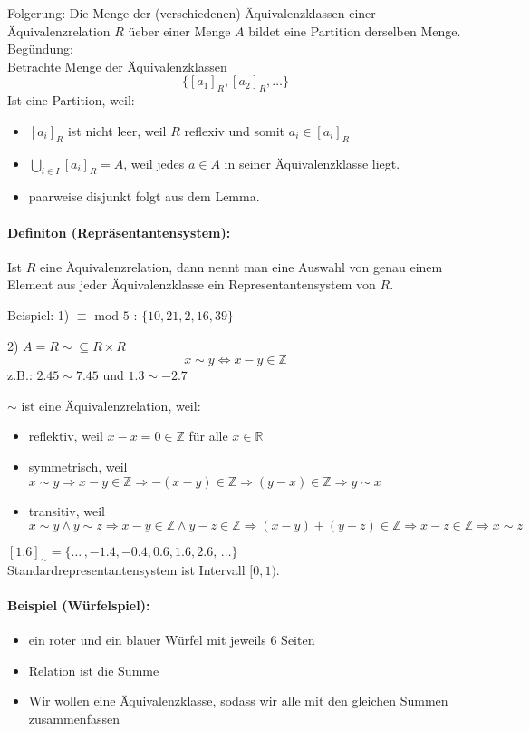 \documentclass[10pt,a4paper]{article}
\begin{document}
Folgerung: Die Menge der (verschiedenen) \"Aquivalenzklassen einer \"Aquivalenzrelation $R$ \"ueber einer Menge $A$ bildet eine Partition derselben Menge.\\
Begündung:\\
Betrachte Menge der \"Aquivalenzklassen
\[
\{[a_1]_R,[a_2]_R,\ldots\}
\]
Ist eine Partition, weil:
\begin{itemize}
\item $[a_i]_R$ ist nicht leer, weil $R$ reflexiv und somit $a_i \in [a_i]_R$
\item $\bigcup_{i \in I} [a_i]_R = A$, weil jedes $a\in A$ in seiner \"Aquivalenzklasse liegt.
\item paarweise disjunkt folgt aus dem Lemma.
\end{itemize}
\paragraph{Definiton (Repr\"asentantensystem): }Ist $R$ eine Äquivalenzrelation, dann nennt man eine Auswahl von genau einem Element aus jeder Äquivalenzklasse ein Representantensystem von $R$.

Beispiel: 1) $\equiv$ mod $5$ : $\{10,21,2,16,39\}$


2) $A=R \sim \subseteq R \times R$
\[
x\sim y \Leftrightarrow x-y \in \mathbb{Z}
\]
z.B.: $2.45 \sim 7.45$ und $1.3 \sim -2.7$

$\sim$ ist eine Äquivalenzrelation, weil:
\begin{itemize}
\item reflektiv, weil $x-x = 0 \in \mathbb{Z}$ für alle $x\in\mathbb{R}$
\item symmetrisch, weil $x\sim y \Rightarrow x-y \in \mathbb{Z} \Rightarrow -(x-y) \in \mathbb{Z} \Rightarrow  (y-x) \in \mathbb{Z} \Rightarrow y\sim x$
\item transitiv, weil $x\sim y \land y\sim z \Rightarrow x-y \in \mathbb{Z} \land y-z \in \mathbb{Z} \Rightarrow (x-y)+(y-z)\in \mathbb{Z} \Rightarrow x-z \in \mathbb{Z} \Rightarrow x\sim z$
\end{itemize}

$[1.6]_{\sim} = \{ \ldots\, , -1.4, -0.4, 0.6, 1.6, 2.6,\, \ldots \}$\\
Standardrepresentantensystem ist Intervall $[0,1)$.


\paragraph{Beispiel (Würfelspiel): }
\begin{itemize}
\item ein roter und ein blauer Würfel mit jeweils $6$ Seiten
\item Relation ist die Summe
\item Wir wollen eine Äquivalenzklasse, sodass wir alle mit den gleichen Summen zusammenfassen
\end{itemize}
\end{document}
